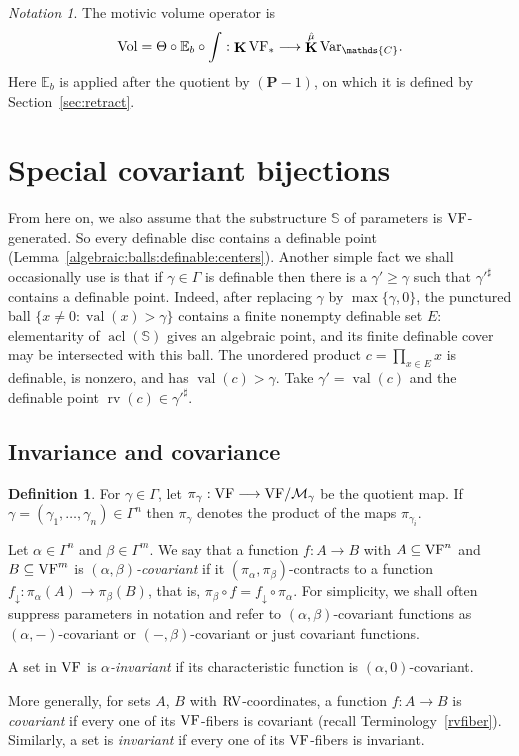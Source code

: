 \documentclass[12pt]{amsart}
\newcommand{\memph}[1]{{\color{magenta}\emph{#1}}}
\theoremstyle{plain}
\theoremstyle{definition}
\newtheorem{defn}[thm]{Definition}
\theoremstyle{remark}
\newtheorem{nota}[thm]{Notation}
\numberwithin{equation}{section}
\theoremstyle{plain}
\newcommand{\VF}{\textup{VF}}
\newcommand{\RV}{\textup{RV}}
\newcommand{\MM}{\mdl M}
\DeclareMathOperator{\acl}{acl}
\newcommand{\C}{\mathds{C}}
\newcommand{\0}{\emptyset}
\newcommand{\mdl}[1]{\mathcal{#1}}  %
\newcommand{\bb}[1]{\mathbb{#1}}
\newcommand{\fun}{\longrightarrow}
\newcommand{\sub}{\subseteq}
\DeclareMathOperator{\rv}{rv}
\DeclareMathOperator{\vv}{val}
\DeclareMathOperator{\ggk}{\mathbf{K}}
\newcommand{\var}{\textup{Var}}
\DeclareMathOperator{\Vol}{Vol}
\newcommand{\gmv}{\ggk^{\hat \mu}\var_{\C}}
\begin{document}
\begin{nota}\label{mov:vol}
The motivic volume operator is
\[
 \Vol=\Theta\circ\bb E_b\circ\int:
 \ggk\VF_*\longrightarrow\gmv .
\]
Here $\bb E_b$ is applied after the quotient by $(\bm P-1)$, on which it is defined by Section~\ref{sec:retract}.
\end{nota}


\section{Special covariant bijections}\label{sec-pscb}


From here on, we also assume that the substructure $\mathbb{S}$ of parameters is $\VF$-generated. So every definable disc contains a definable point (Lemma~\ref{algebraic:balls:definable:centers}). Another simple fact we shall occasionally use is that if $\gamma \in \Gamma$ is definable then there is a $\gamma' \geq \gamma$ such that $\gamma'^\sharp$ contains a definable point. Indeed, after replacing $\gamma$ by $\max\{\gamma,0\}$, the punctured ball $\{x\ne0:\vv(x)>\gamma\}$ contains a finite nonempty definable set $E$: elementarity of $\acl(\mathbb S)$ gives an algebraic point, and its finite definable cover may be intersected with this ball. The unordered product $c=\prod_{x\in E}x$ is definable, is nonzero, and has $\vv(c)>\gamma$. Take $\gamma'=\vv(c)$ and the definable point $\rv(c)\in\gamma'^\sharp$.

\subsection{Invariance and covariance}\label{sec:inv:cov}

\begin{defn}\label{defn:binv}
For $\gamma \in \Gamma$, let $\pi_\gamma: \VF \fun \VF / \MM_{\gamma}$ be the quotient  map. If $\gamma = (\gamma_1, \ldots, \gamma_n) \in \Gamma^n$ then $\pi_{\gamma}$ denotes the product of the maps $\pi_{\gamma_i}$.

Let $\alpha \in \Gamma^n$ and $\beta \in \Gamma^m$. We say that a function $f :A \fun B$ with $A \sub \VF^n$ and $B \sub \VF^m$  is \memph{$(\alpha, \beta)$-covariant} if it $(\pi_{\alpha}, \pi_{\beta})$-contracts to a function $f_\downarrow : \pi_{\alpha}(A) \fun \pi_{\beta}(B)$, that is, $\pi_{\beta} \circ f = f_\downarrow \circ \pi_{\alpha}$. For simplicity, we shall often suppress parameters in notation and refer to $(\alpha, \beta)$-covariant functions as $(\alpha, -)$-covariant or $(-,\beta)$-covariant or just  covariant functions.

A set  in $\VF$ is \memph{$\alpha$-invariant} if its characteristic function is $(\alpha, 0)$-covariant.


More generally, for sets $A$, $B$ with $\RV$-coordinates, a function $f : A \fun B$ is \memph{covariant} if every one of its $\VF$-fibers    is covariant (recall Terminology~\ref{rvfiber}). Similarly, a set is \memph{invariant} if every one of its $\VF$-fibers is invariant.
\end{defn}
\end{document}
